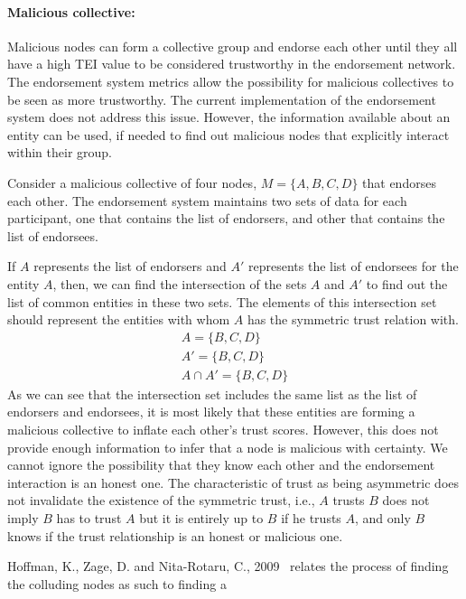 \paragraph{Malicious collective:}Malicious nodes can form a collective group
and endorse each other until they all have a high \ac{TEI} value to be
considered trustworthy in the endorsement network. The endorsement system
metrics allow the possibility for malicious collectives to be seen as more
trustworthy. The current implementation of the endorsement system does not
address this issue. However, the information available about an entity can be
used, if needed to find out malicious nodes that explicitly interact within
their group. \par
Consider a malicious collective of four nodes, $M = \{A,B,C,D\}$ that endorses
each other. The endorsement system maintains two sets of data for each
participant, one that contains the list of endorsers, and other that contains
the list of endorsees. \par
If $A$ represents the list of endorsers and $A'$ represents the list of
endorsees for the entity $A$, then, we can find the intersection of the sets
$A$ and $A'$ to find out the list of common entities in these two sets. The
elements of this intersection set should represent the entities with whom $A$
has the symmetric trust relation with.  
\begin{equation}
	\begin{split}
	A= \{B,C,D\} \\
	A' = \{B,C,D\} \\
	A \cap A' = \{B,C,D\}
\end{split}
\end{equation}
As we can see that the intersection set includes the same list as the list of
endorsers and endorsees, it is most likely that these entities are forming a
malicious collective to inflate each other's trust scores. However, this does
not provide enough information to infer that a node is malicious with
certainty. We cannot ignore the possibility that they know each other and the
endorsement interaction is an honest one. The characteristic of trust as being
asymmetric does not invalidate the existence of the symmetric trust, i.e., $A$
trusts $B$ does not imply $B$ has to trust $A$ but it is entirely up to $B$ if
he trusts $A$, and only $B$ knows if the trust relationship is an honest or
malicious one. \par
Hoffman, K., Zage, D. and Nita-Rotaru, C., 2009~\cite{hoffman2009survey}
relates the process of finding the colluding nodes as such to finding a
